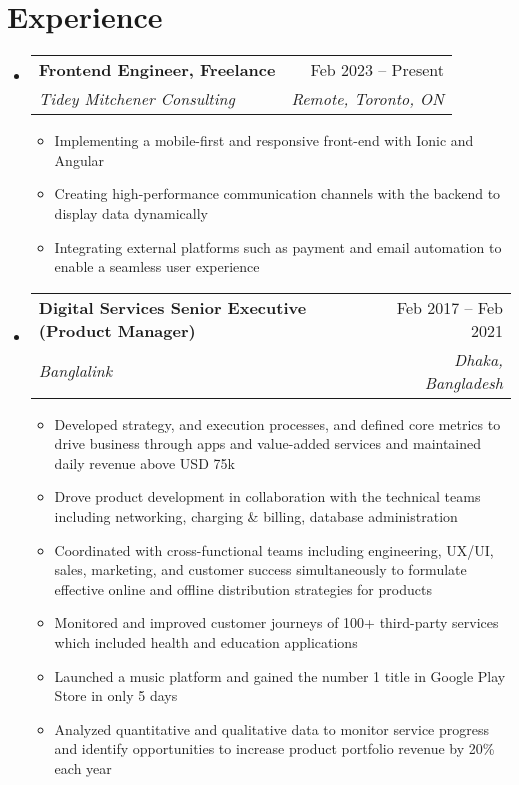 \documentclass[letterpaper,11pt]{article}
\makeatletter
\newcommand{\resumeItem}[1]{
  \item\small{
    {#1 \vspace{-2pt}}
  }
}
\newcommand{\resumeSubheading}[4]{
  \vspace{-2pt}\item
    \begin{tabular*}{0.97\textwidth}[t]{l@{\extracolsep{\fill}}r}
      \textbf{#1} & #2 \\
      \textit{\small#3} & \textit{\small #4} \\
    \end{tabular*}\vspace{-7pt}
}
\newcommand{\resumeSubHeadingListStart}{\begin{itemize}[leftmargin=0.15in, label={}]}
\newcommand{\resumeSubHeadingListEnd}{\end{itemize}}
\newcommand{\resumeItemListStart}{\begin{itemize}}
\newcommand{\resumeItemListEnd}{\end{itemize}\vspace{-5pt}}
\makeatother
\begin{document}
\section{Experience}
  \resumeSubHeadingListStart

    \resumeSubheading
      {Frontend Engineer, Freelance}{Feb 2023 -- Present}
      {Tidey Mitchener Consulting}{Remote, Toronto, ON}
      \resumeItemListStart
        \resumeItem{Implementing a mobile-first and responsive front-end with Ionic and Angular}
        \resumeItem{Creating high-performance communication channels with the backend to display data dynamically}
        \resumeItem{Integrating external platforms such as payment and email automation to enable a seamless user experience}
      \resumeItemListEnd

    \resumeSubheading
      {Digital Services Senior Executive (Product Manager)}{Feb 2017 – Feb 2021}
      {Banglalink}{Dhaka, Bangladesh}
      \resumeItemListStart
        \resumeItem{Developed strategy, and execution processes, and defined core metrics to drive business through apps and value-added services and maintained daily revenue above USD 75k}
        \resumeItem{Drove product development in collaboration with the technical teams including networking, charging \& billing, database administration}
        \resumeItem{Coordinated with cross-functional teams including engineering, UX/UI, sales, marketing, and customer success simultaneously to formulate effective online and offline distribution strategies for products}
        \resumeItem{Monitored and improved customer journeys of 100+ third-party services which included health and education applications}
        \resumeItem{Launched a music platform and gained the number 1 title in Google Play Store in only 5 days}
        \resumeItem{Analyzed quantitative and qualitative data to monitor service progress and identify opportunities to increase product portfolio revenue by 20\% each year}
    \resumeItemListEnd

  \resumeSubHeadingListEnd


\end{document}
